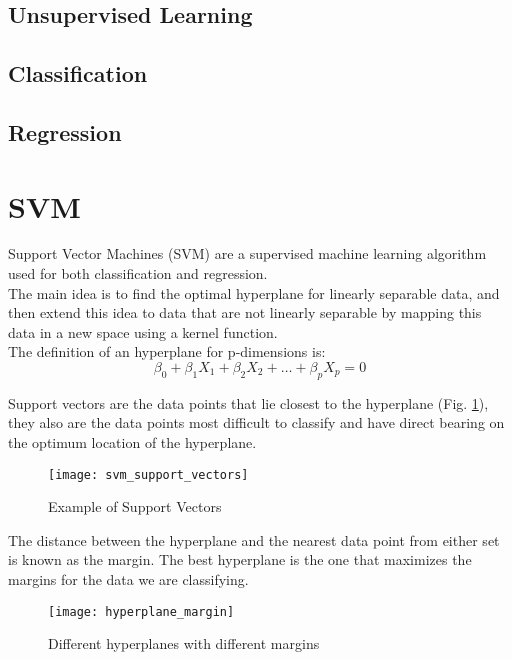 \subsection{Unsupervised Learning} \label{unsupervised}

\subsection{Classification} \label{classification}

\subsection{Regression} \label{regression}

\pagebreak

\section{SVM} \label{svm}
Support Vector Machines (SVM) are a supervised machine learning algorithm used for both classification and regression. \\
The main idea is to find the optimal hyperplane for linearly separable data, and then extend this idea to data that are not linearly separable by mapping this data in a new space using a kernel function.\\
The definition of an hyperplane for p-dimensions is:
\begin{equation}
\beta_0 + \beta_1 X_1 + \beta_2 X_2 + \dots + \beta_p X_p = 0
\end{equation}

Support vectors are the data points that lie closest to the hyperplane (Fig. \ref{fig:suppvec}), they also are the data points most difficult to classify and have direct bearing on the optimum location of the hyperplane.\\
\begin{figure}[h]
	\centering
	\texttt{[image: svm\_support\_vectors]}
	\caption{Example of Support Vectors}
	\label{fig:suppvec}
\end{figure}

The distance between the hyperplane and the nearest data point from either set is known as the margin. The best hyperplane is the one that maximizes the margins for the data we are classifying.\\
\begin{figure}[H]
	\centering
	\texttt{[image: hyperplane\_margin]}
	\caption{Different hyperplanes with different margins \cite{svm_monkeylearn}}
\end{figure}

